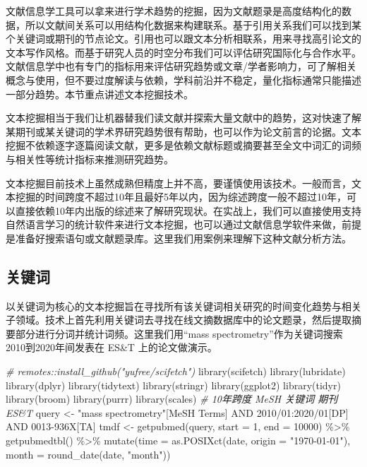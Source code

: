 \documentclass[]{tufte-book}
\newenvironment{Shaded}{}{}
\newcommand{\AttributeTok}[1]{\textcolor[rgb]{0.49,0.56,0.16}{#1}}
\newcommand{\CommentTok}[1]{\textcolor[rgb]{0.38,0.63,0.69}{\textit{#1}}}
\newcommand{\DecValTok}[1]{\textcolor[rgb]{0.25,0.63,0.44}{#1}}
\newcommand{\FunctionTok}[1]{\textcolor[rgb]{0.02,0.16,0.49}{#1}}
\newcommand{\NormalTok}[1]{#1}
\newcommand{\OtherTok}[1]{\textcolor[rgb]{0.00,0.44,0.13}{#1}}
\newcommand{\SpecialCharTok}[1]{\textcolor[rgb]{0.25,0.44,0.63}{#1}}
\newcommand{\StringTok}[1]{\textcolor[rgb]{0.25,0.44,0.63}{#1}}
\begin{document}
文献信息学工具可以拿来进行学术趋势的挖掘，因为文献题录是高度结构化的数据，所以文献间关系可以用结构化数据来构建联系。基于引用关系我们可以找到某个关键词或期刊的节点论文。引用也可以跟文本分析相联系，用来寻找高引论文的文本写作风格。而基于研究人员的时空分布我们可以评估研究国际化与合作水平。文献信息学中也有专门的指标用来评估研究趋势或文章/学者影响力，可了解相关概念与使用，但不要过度解读与依赖，学科前沿并不稳定，量化指标通常只能描述一部分趋势。本节重点讲述文本挖掘技术。

文本挖掘相当于我们让机器替我们读文献并探索大量文献中的趋势，这对快速了解某期刊或某关键词的学术界研究趋势很有帮助，也可以作为论文前言的论据。文本挖掘不依赖逐字逐篇阅读文献，更多是依赖文献标题或摘要甚至全文中词汇的词频与相关性等统计指标来推测研究趋势。

文本挖掘目前技术上虽然成熟但精度上并不高，要谨慎使用该技术。一般而言，文本挖掘的时间跨度不超过10年且最好5年以内，因为综述跨度一般不超过10年，可以直接依赖10年内出版的综述来了解研究现状。在实战上，我们可以直接使用支持自然语言学习的统计软件来进行文本挖掘，也可以通过文献信息学软件来做，前提是准备好搜索语句或文献题录库。这里我们用案例来理解下这种文献分析方法。

\hypertarget{ux5173ux952eux8bcd}{%
\subsection{关键词}\label{ux5173ux952eux8bcd}}

以关键词为核心的文本挖掘旨在寻找所有该关键词相关研究的时间变化趋势与相关子领域。技术上首先利用关键词去寻找在线文摘数据库中的论文题录，然后提取摘要部分进行分词并统计词频。这里我们用``mass spectrometry''作为关键词搜索2010到2020年间发表在 ES\&T 上的论文做演示。

\begin{Shaded}
\begin{Highlighting}[]
\CommentTok{\# remotes::install\_github("yufree/scifetch")}
\FunctionTok{library}\NormalTok{(scifetch)}
\FunctionTok{library}\NormalTok{(lubridate)}
\FunctionTok{library}\NormalTok{(dplyr)}
\FunctionTok{library}\NormalTok{(tidytext)}
\FunctionTok{library}\NormalTok{(stringr)}
\FunctionTok{library}\NormalTok{(ggplot2)}
\FunctionTok{library}\NormalTok{(tidyr)}
\FunctionTok{library}\NormalTok{(broom)}
\FunctionTok{library}\NormalTok{(purrr)}
\FunctionTok{library}\NormalTok{(scales)}
\CommentTok{\# 10年跨度 MeSH 关键词 期刊ES\&T}
\NormalTok{query }\OtherTok{\textless{}{-}} \StringTok{\textquotesingle{}"mass spectrometry"[MeSH Terms] AND 2010/01:2020/01[DP] AND 0013{-}936X[TA]\textquotesingle{}}
\NormalTok{tmdf }\OtherTok{\textless{}{-}} \FunctionTok{getpubmed}\NormalTok{(query, }\AttributeTok{start =} \DecValTok{1}\NormalTok{, }\AttributeTok{end =} \DecValTok{10000}\NormalTok{) }\SpecialCharTok{\%\textgreater{}\%}
        \FunctionTok{getpubmedtbl}\NormalTok{() }\SpecialCharTok{\%\textgreater{}\%}
        \FunctionTok{mutate}\NormalTok{(}\AttributeTok{time =} \FunctionTok{as.POSIXct}\NormalTok{(date, }\AttributeTok{origin =} \StringTok{"1970{-}01{-}01"}\NormalTok{),}
         \AttributeTok{month =} \FunctionTok{round\_date}\NormalTok{(date, }\StringTok{"month"}\NormalTok{))}
\end{Highlighting}
\end{Shaded}
\end{document}
